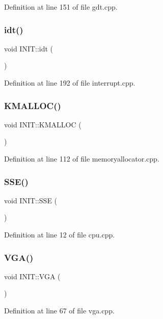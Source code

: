 Definition at line 151 of file gdt.\+cpp.

\mbox{\label{namespace_i_n_i_t_aec8e9f01cb09653075b6e610096b3ca9}} 
\subsubsection{\texorpdfstring{idt()}{idt()}}
{\footnotesize\ttfamily void I\+N\+I\+T\+::idt (\begin{DoxyParamCaption}{ }\end{DoxyParamCaption})}



Definition at line 192 of file interrupt.\+cpp.

\mbox{\label{namespace_i_n_i_t_ac811302ce0948a6a097b445b811f9c14}} 
\subsubsection{\texorpdfstring{K\+M\+A\+L\+L\+O\+C()}{KMALLOC()}}
{\footnotesize\ttfamily void I\+N\+I\+T\+::\+K\+M\+A\+L\+L\+OC (\begin{DoxyParamCaption}{ }\end{DoxyParamCaption})}



Definition at line 112 of file memoryallocator.\+cpp.

\mbox{\label{namespace_i_n_i_t_a8928ddbb4ca671dfe1c740da380fa0c4}} 
\subsubsection{\texorpdfstring{S\+S\+E()}{SSE()}}
{\footnotesize\ttfamily void I\+N\+I\+T\+::\+S\+SE (\begin{DoxyParamCaption}{ }\end{DoxyParamCaption})}



Definition at line 12 of file cpu.\+cpp.

\mbox{\label{namespace_i_n_i_t_abae5789d80f8edd37455f3b167779654}} 
\subsubsection{\texorpdfstring{V\+G\+A()}{VGA()}}
{\footnotesize\ttfamily void I\+N\+I\+T\+::\+V\+GA (\begin{DoxyParamCaption}{ }\end{DoxyParamCaption})}



Definition at line 67 of file vga.\+cpp.

